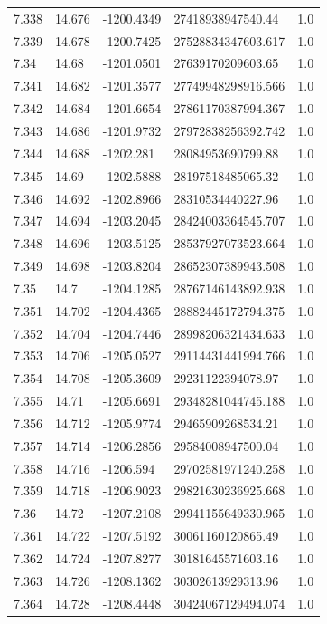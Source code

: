 \begin{tabular}{lllll}
7.338 & 14.676 & -1200.4349 & 27418938947540.44 & 1.0 \\
7.339 & 14.678 & -1200.7425 & 27528834347603.617 & 1.0 \\
7.34 & 14.68 & -1201.0501 & 27639170209603.65 & 1.0 \\
7.341 & 14.682 & -1201.3577 & 27749948298916.566 & 1.0 \\
7.342 & 14.684 & -1201.6654 & 27861170387994.367 & 1.0 \\
7.343 & 14.686 & -1201.9732 & 27972838256392.742 & 1.0 \\
7.344 & 14.688 & -1202.281 & 28084953690799.88 & 1.0 \\
7.345 & 14.69 & -1202.5888 & 28197518485065.32 & 1.0 \\
7.346 & 14.692 & -1202.8966 & 28310534440227.96 & 1.0 \\
7.347 & 14.694 & -1203.2045 & 28424003364545.707 & 1.0 \\
7.348 & 14.696 & -1203.5125 & 28537927073523.664 & 1.0 \\
7.349 & 14.698 & -1203.8204 & 28652307389943.508 & 1.0 \\
7.35 & 14.7 & -1204.1285 & 28767146143892.938 & 1.0 \\
7.351 & 14.702 & -1204.4365 & 28882445172794.375 & 1.0 \\
7.352 & 14.704 & -1204.7446 & 28998206321434.633 & 1.0 \\
7.353 & 14.706 & -1205.0527 & 29114431441994.766 & 1.0 \\
7.354 & 14.708 & -1205.3609 & 29231122394078.97 & 1.0 \\
7.355 & 14.71 & -1205.6691 & 29348281044745.188 & 1.0 \\
7.356 & 14.712 & -1205.9774 & 29465909268534.21 & 1.0 \\
7.357 & 14.714 & -1206.2856 & 29584008947500.04 & 1.0 \\
7.358 & 14.716 & -1206.594 & 29702581971240.258 & 1.0 \\
7.359 & 14.718 & -1206.9023 & 29821630236925.668 & 1.0 \\
7.36 & 14.72 & -1207.2108 & 29941155649330.965 & 1.0 \\
7.361 & 14.722 & -1207.5192 & 30061160120865.49 & 1.0 \\
7.362 & 14.724 & -1207.8277 & 30181645571603.16 & 1.0 \\
7.363 & 14.726 & -1208.1362 & 30302613929313.96 & 1.0 \\
7.364 & 14.728 & -1208.4448 & 30424067129494.074 & 1.0 \\

\end{tabular}
